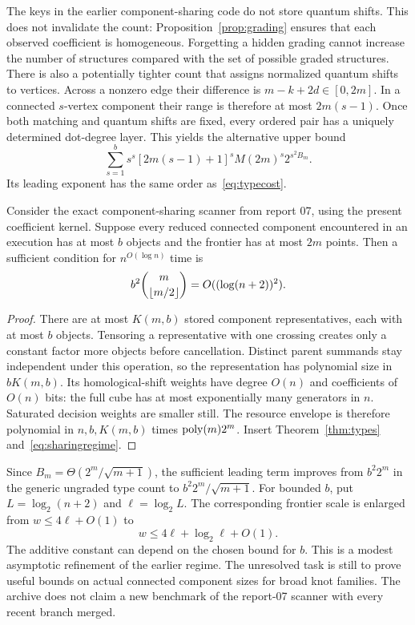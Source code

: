 The keys in the earlier component-sharing code do not store quantum
shifts. This does not invalidate the count: Proposition~\ref{prop:grading}
ensures that each observed coefficient is homogeneous. Forgetting a
hidden grading cannot increase the number of structures compared with
the set of possible graded structures. There is also a potentially
tighter count that assigns normalized quantum shifts to vertices.
Across a nonzero edge their difference is
$m-k+2d\in[0,2m]$. In a connected $s$-vertex component their range is
therefore at most $2m(s-1)$. Once both matching and quantum shifts are
fixed, every ordered pair has a uniquely determined dot-degree layer.
This yields the alternative upper bound
\[
 \sum_{s=1}^{b}s^s[2m(s-1)+1]^s M(2m)^s 2^{s^2 B_m}.
\]
Its leading exponent has the same order as~\eqref{eq:typecost}.

\begin{corollary}
\label{cor:sharing}
Consider the exact component-sharing scanner from report 07, using the
present coefficient kernel. Suppose every reduced connected component
encountered in an execution has at most $b$ objects and the frontier has
at most $2m$ points. Then a sufficient condition for
$n^{O(\log n)}$ time is
\begin{equation}
 b^2\binom{m}{\left\lfloor m/2\right\rfloor}=O((\log(n+2))^2).
 \label{eq:sharingregime}
\end{equation}
\end{corollary}
\begin{proof}
There are at most $K(m,b)$ stored component representatives, each with
at most $b$ objects. Tensoring a representative with one crossing creates
only a constant factor more objects before cancellation. Distinct parent
summands stay independent under this operation, so the representation
has polynomial size in $bK(m,b)$. Its homological-shift weights have
degree $O(n)$ and coefficients of $O(n)$ bits: the full cube has at most
exponentially many generators in $n$. Saturated decision weights are
smaller still. The resource envelope is therefore polynomial in
$n,b,K(m,b)$ times $\operatorname{poly}(m)2^m$. Insert
Theorem~\ref{thm:types} and~\eqref{eq:sharingregime}.
\end{proof}

Since $B_m=\Theta(2^m/\sqrt{m+1})$, the sufficient leading term improves
from $b^2 2^m$ in the generic ungraded type count to
$b^2 2^m/\sqrt{m+1}$. For bounded $b$, put
$L=\log_2(n+2)$ and $\ell=\log_2 L$. The corresponding frontier scale
is enlarged from $w\leq4\ell+O(1)$ to
\[
 w\leq4\ell+\log_2\ell+O(1).
\]
The additive constant can depend on the chosen bound for $b$.
This is a modest asymptotic refinement of the earlier regime. The
unresolved task is still to prove useful bounds on actual connected
component sizes for broad knot families. The archive does not claim a
new benchmark of the report-07 scanner with every recent branch merged.
